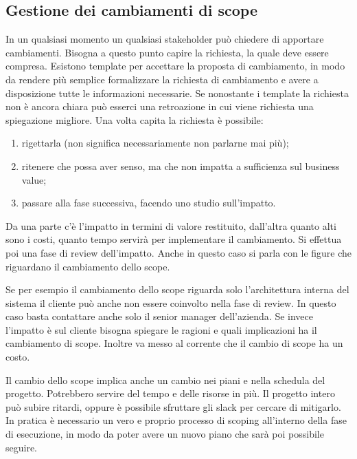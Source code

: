 \subsection{Gestione dei cambiamenti di scope}
In un qualsiasi momento un qualsiasi stakeholder può chiedere di apportare cambiamenti. Bisogna a questo punto capire la richiesta, la quale deve essere compresa. Esistono template per accettare la proposta di cambiamento, in modo da rendere più semplice formalizzare la richiesta di cambiamento e avere a disposizione tutte le informazioni necessarie. Se nonostante i template la richiesta non è ancora chiara può esserci una retroazione in cui viene richiesta una spiegazione migliore.
\noindent Una volta capita la richiesta è possibile:
\begin{enumerate}
	\item rigettarla (non significa necessariamente non parlarne mai più);
	\item ritenere che possa aver senso, ma che non impatta a sufficienza sul business value;
	\item passare alla fase successiva, facendo uno studio sull'impatto.
\end{enumerate}
Da una parte c'è l'impatto in termini di valore restituito, dall'altra quanto alti sono i costi, quanto tempo servirà per implementare il cambiamento. Si effettua poi una fase di review dell'impatto. Anche in questo caso si parla con le figure che riguardano il cambiamento dello scope.
\begin{info}
	Se per esempio il cambiamento dello scope riguarda solo l'architettura interna del sistema il cliente può anche non essere coinvolto nella fase di review. In questo caso basta contattare anche solo il senior manager dell'azienda.\newline
	\noindent Se invece l'impatto è sul cliente bisogna spiegare le ragioni e quali implicazioni ha il cambiamento di scope. Inoltre va messo al corrente che il cambio di scope ha un costo.
\end{info}
Il cambio dello scope implica anche un cambio nei piani e nella schedula del progetto. Potrebbero servire del tempo e delle risorse in più. Il progetto intero può subire ritardi, oppure è possibile sfruttare gli slack per cercare di mitigarlo. In pratica è necessario un vero e proprio processo di scoping all'interno della fase di esecuzione, in modo da poter avere un nuovo piano che sarà poi possibile seguire.

